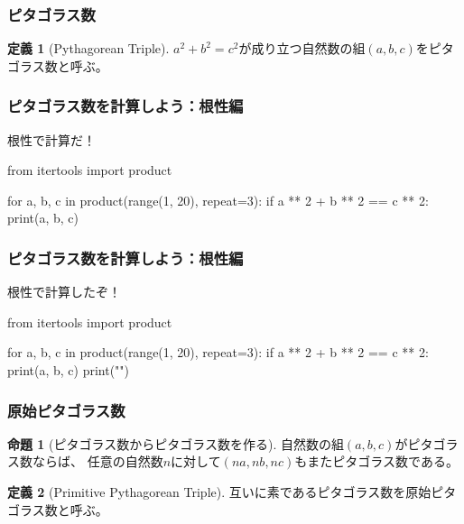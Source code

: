 \documentclass[dvipdfmx,11pt,notheorems]{beamer}
\theoremstyle{definition}
\newtheorem{definition}{定義}
\newtheorem{proposition}{命題}
\begin{document}
\begin{frame}\frametitle{ピタゴラス数}

\begin{definition}[Pythagorean Triple]
$a^{2} + b^{2} = c^{2}$が成り立つ自然数の組$(a, b, c)$をピタゴラス数と呼ぶ。
\end{definition}

\end{frame}

\begin{frame}[fragile]\frametitle{ピタゴラス数を計算しよう：根性編}

\begin{block}{根性で計算だ！}
\begin{pyverbatim}
from itertools import product

for a, b, c in product(range(1, 20), repeat=3):
    if a ** 2 + b ** 2 == c ** 2:
        print(a, b, c)
\end{pyverbatim}
\end{block}

\end{frame}

\begin{frame}[fragile]\frametitle{ピタゴラス数を計算しよう：根性編}

\begin{block}{根性で計算したぞ！}
\begin{pycode}
from itertools import product

for a, b, c in product(range(1, 20), repeat=3):
    if a ** 2 + b ** 2 == c ** 2:
        print(a, b, c)
        print("\n")
\end{pycode}
\end{block}

\end{frame}

\begin{frame}\frametitle{原始ピタゴラス数}

\begin{proposition}[ピタゴラス数からピタゴラス数を作る]
自然数の組$(a, b, c)$がピタゴラス数ならば、
任意の自然数$n$に対して$(na, nb, nc)$もまたピタゴラス数である。
\end{proposition}

\begin{definition}[Primitive Pythagorean Triple]
互いに素であるピタゴラス数を原始ピタゴラス数と呼ぶ。
\end{definition}

\end{frame}
\end{document}
